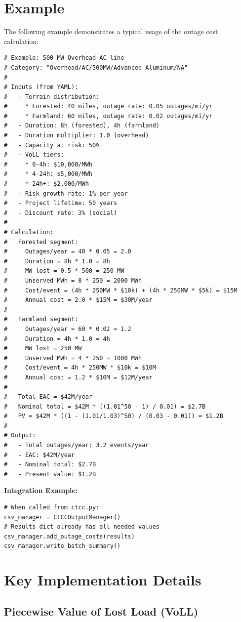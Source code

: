 \documentclass[12pt]{article}
\begin{document}
\section{Example}

The following example demonstrates a typical usage of the outage cost calculation:

\begin{lstlisting}
# Example: 500 MW Overhead AC line
# Category: "Overhead/AC/500MW/Advanced Aluminum/NA"
# 
# Inputs (from YAML):
#   - Terrain distribution:
#     * Forested: 40 miles, outage rate: 0.05 outages/mi/yr
#     * Farmland: 60 miles, outage rate: 0.02 outages/mi/yr
#   - Duration: 8h (forested), 4h (farmland)
#   - Duration multiplier: 1.0 (overhead)
#   - Capacity at risk: 50%
#   - VoLL tiers:
#     * 0-4h: $10,000/MWh
#     * 4-24h: $5,000/MWh
#     * 24h+: $2,000/MWh
#   - Risk growth rate: 1% per year
#   - Project lifetime: 50 years
#   - Discount rate: 3% (social)
#
# Calculation:
#   Forested segment:
#     Outages/year = 40 * 0.05 = 2.0
#     Duration = 8h * 1.0 = 8h
#     MW lost = 0.5 * 500 = 250 MW
#     Unserved MWh = 8 * 250 = 2000 MWh
#     Cost/event = (4h * 250MW * $10k) + (4h * 250MW * $5k) = $15M
#     Annual cost = 2.0 * $15M = $30M/year
#   
#   Farmland segment:
#     Outages/year = 60 * 0.02 = 1.2
#     Duration = 4h * 1.0 = 4h
#     MW lost = 250 MW
#     Unserved MWh = 4 * 250 = 1000 MWh
#     Cost/event = 4h * 250MW * $10k = $10M
#     Annual cost = 1.2 * $10M = $12M/year
#   
#   Total EAC = $42M/year
#   Nominal total = $42M * ((1.01^50 - 1) / 0.01) = $2.7B
#   PV = $42M * ((1 - (1.01/1.03)^50) / (0.03 - 0.01)) = $1.2B
#
# Output:
#   - Total outages/year: 3.2 events/year
#   - EAC: $42M/year
#   - Nominal total: $2.7B
#   - Present value: $1.2B
\end{lstlisting}

\textbf{Integration Example:}

\begin{lstlisting}
# When called from ctcc.py:
csv_manager = CTCCOutputManager()
# Results dict already has all needed values
csv_manager.add_outage_costs(results)
csv_manager.write_batch_summary()
\end{lstlisting}

\section{Key Implementation Details}

\subsection{Piecewise Value of Lost Load (VoLL)}
\end{document}
